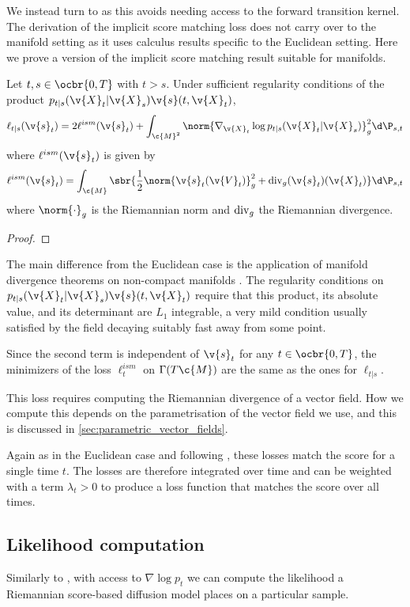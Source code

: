 We instead turn to  as this avoids needing access to the forward transition kernel.
The derivation of the implicit score matching loss does not carry over to the manifold setting as it uses calculus results specific to the Euclidean setting.
Here we prove a version of the implicit score matching result suitable for manifolds.
\begin{proposition}
	\label{prop:manifold_ism}
	Let \(t, s \in \ocbr{0, T}\) with \(t > s\).
	Under sufficient regularity conditions of the product \(p_{t|s}(\v{X}_t | \v{X}_s) \v{s}(t, \v{X}_t)\),
	\[
		\ell_{t|s}(\v{s}_t) = 2 \ell^{ism}(\v{s}_t) + \int_{\c{M}^2} \norm{\nabla_{\v{X}_t}\log p_{t|s}(\v{X}_t | \v{X}_s) }_g^2 \d\P_{s, t}
	\]
	where \(\ell^{ism}(\v{s}_t)\) is given by
	\[
		\ell^{ism}(\v{s}_t) = \int_{\c{M}} \sbr{\frac{1}{2}\norm{\v{s}_t(\v{V}_t)}_g^2 + \dive_g(\v{s}_t)(\v{X}_t)} \d\P_{s, t}
	\]
	where \(\norm{\cdot}_g\) is the Riemannian norm and \(\operatorname{div}_g\) the Riemannian divergence.
\end{proposition}
\begin{proof}
\end{proof}
The main difference from the Euclidean case is the application of manifold divergence theorems on non-compact manifolds \parencite{gaffney1954}.
The regularity conditions on \(p_{t|s}(\v{X}_t | \v{X}_s) \v{s}(t, \v{X}_t)\) require that this product, its absolute value, and its determinant are \(L_1\) integrable, a very mild condition usually satisfied by the field decaying suitably fast away from some point.

Since the second term is independent of \(\v{s}_t\)  for any \(t \in \ocbr{0,T}\), the minimizers of the loss \(\ell^{ism}_t\) on \(\Gamma(T\c{M})\)  are the same as the ones for \(\ell_{t|s}\).

This loss requires computing the Riemannian divergence of a vector field.
How we compute this depends on the parametrisation of the vector field we use, and this is discussed in \cref{sec:parametric_vector_fields}.

Again as in the Euclidean case and following \textcite{song2020improved, nichol2021improved}, these losses match the score for a single time \(t\). 
The losses are therefore integrated over time and can be weighted with a term \(\lambda_t > 0\) to produce a loss function that matches the score over all times.


\subsection{Likelihood computation}
\label{sec:likel-comp}
Similarly to \textcite{song2020score}, with access to \(\nabla\log p_t\) we can compute the likelihood a Riemannian score-based diffusion model places on a particular sample.

